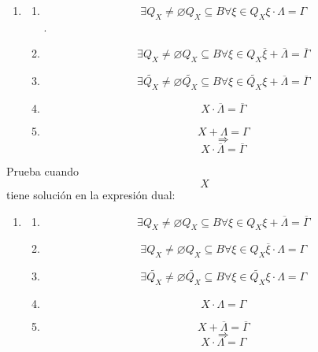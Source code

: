 \begin{enumerate}
\begin{enumerate}
\begin{enumerate}
\begin{enumerate}
\begin{enumerate}
          \begin{enumerate}
          \def\labelenumvi{\arabic{enumvi}.}
          \tightlist
          \item
            \begin{enumerate}
            \def\labelenumvii{\arabic{enumvii}.}
            \tightlist
            \item
              \[\exists{Q_{X} \neq \varnothing}{Q_{X} \subseteq B}\forall{\xi \in Q_{X}}{{\xi \cdot \Lambda} = \Gamma}\].
            \item
              \[\exists{Q_{X} \neq \varnothing}{Q_{X} \subseteq B}\forall{\xi \in Q_{X}}{{\overline{\xi} + \overline{\Lambda}} = \overline{\Gamma}}\]
            \item
              \[\exists{\widetilde{Q_{X}} \neq \varnothing}{\widetilde{Q_{X}} \subseteq B}\forall{\xi \in \widetilde{Q_{X}}}{{\xi + \overline{\Lambda}} = \overline{\Gamma}}\]
            \item
              \[{X \cdot \overline{\Lambda}} = \overline{\Gamma}\]
            \item
              \[{X + \Lambda} = \Gamma\] \[\Rightarrow\]
              \[{X \cdot \overline{\Lambda}} = \overline{\Gamma}\]
            \end{enumerate}
          \end{enumerate}

          Prueba cuando \[X\] tiene solución en la expresión dual:

          \begin{enumerate}
          \def\labelenumvi{\arabic{enumvi}.}
          \tightlist
          \item
            \begin{enumerate}
            \def\labelenumvii{\arabic{enumvii}.}
            \tightlist
            \item
              \[\exists{Q_{X} \neq \varnothing}{Q_{X} \subseteq B}\forall{\xi \in Q_{X}}{{\xi + \overline{\Lambda}} = \overline{\Gamma}}\]
            \item
              \[\exists{Q_{X} \neq \varnothing}{Q_{X} \subseteq B}\forall{\xi \in Q_{X}}{{\overline{\xi} \cdot \Lambda} = \Gamma}\]
            \item
              \[\exists{\widetilde{Q_{X}} \neq \varnothing}{\widetilde{Q_{X}} \subseteq B}\forall{\xi \in \widetilde{Q_{X}}}{{\xi \cdot \Lambda} = \Gamma}\]
            \item
              \[{X \cdot \Lambda} = \Gamma\]
            \item
              \[{X + \overline{\Lambda}} = \overline{\Gamma}\]
              \[\Rightarrow\] \[{X \cdot \Lambda} = \Gamma\]
            \end{enumerate}
          \end{enumerate}


\end{enumerate}
\end{enumerate}
\end{enumerate}
\end{enumerate}
\end{enumerate}
